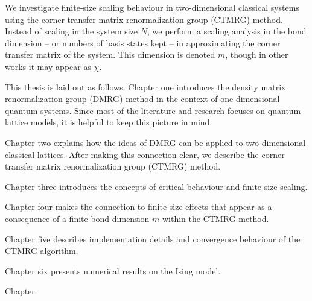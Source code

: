 We investigate finite-size scaling behaviour in two-dimensional classical systems using
the corner transfer matrix renormalization group (CTMRG) method. Instead of scaling in the
system size $N$, we perform a scaling analysis in the bond dimension -- or numbers of
basis states kept -- in approximating the corner transfer matrix of the system. This
dimension is denoted $m$, though in other works it may appear as $\chi$.

This thesis is laid out as follows. Chapter one introduces the density matrix
renormalization group (DMRG) method in the context of one-dimensional quantum systems.
Since most of the literature and research focuses on quantum lattice models, it is helpful
to keep this picture in mind.

Chapter two explains how the ideas of DMRG can be applied to two-dimensional classical
lattices. After making this connection clear, we describe the corner transfer matrix
renormalization group (CTMRG) method.

Chapter three introduces the concepts of critical behaviour and finite-size scaling.

Chapter four makes the connection to finite-size effects that appear as a consequence of a finite bond dimension $m$
within the CTMRG method.

Chapter five describes implementation details and convergence behaviour of the CTMRG algorithm.

Chapter six presents numerical results on the Ising model.

Chapter   

